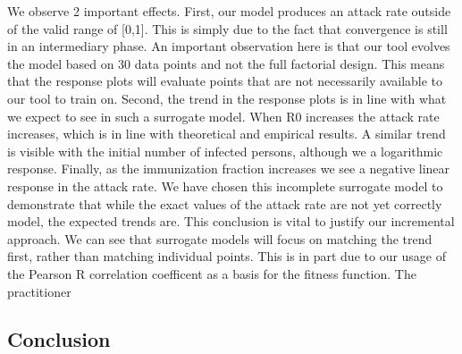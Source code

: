 We observe 2 important effects. First, our model produces an attack rate outside of the valid range of [0,1]. This is simply due to the fact that convergence is still in an intermediary phase. An important observation here is that our tool evolves the model based on 30 data points and not the full factorial design. This means that the response plots will evaluate points that are not necessarily available to our tool to train on. Second, the trend in the response plots is in line with what we expect to see in such a surrogate model. When R0 increases the attack rate increases, which is in line with theoretical and empirical results. A similar trend is visible with the initial number of infected persons, although we a logarithmic response. Finally, as the immunization fraction increases we see a negative linear response in the attack rate. We have chosen this incomplete surrogate model to demonstrate that while the exact values of the attack rate are not yet correctly model, the expected trends are. This conclusion is vital to justify our incremental approach. We can see that surrogate models will focus on matching the trend first, rather than matching individual points. This is in part due to our usage of the Pearson R correlation coefficent as a basis for the fitness function. The practitioner 



\subsection{Conclusion}

